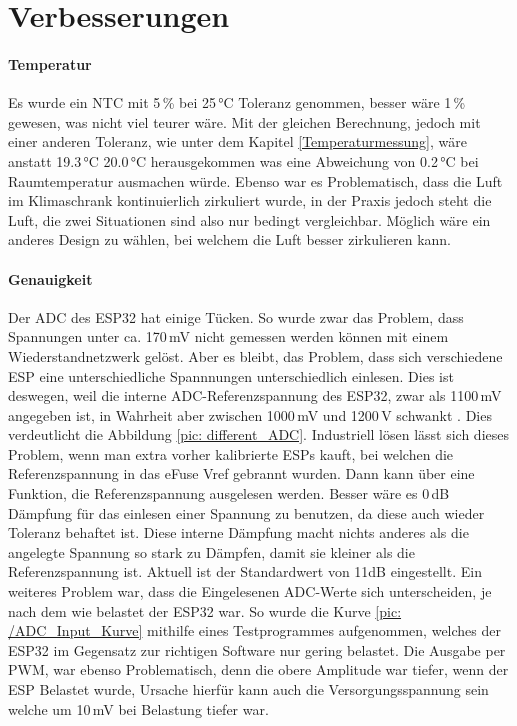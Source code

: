 \section{Verbesserungen} 
\label{Verbesserungen}

\paragraph{Temperatur}
Es wurde ein NTC mit 5\,\% bei 25\,°C Toleranz genommen, besser wäre 1\,\% gewesen, was nicht viel teurer wäre. Mit der gleichen Berechnung, jedoch mit einer anderen Toleranz, wie unter dem Kapitel \ref{Temperaturmessung}, wäre anstatt 19.3\,°C 20.0\,°C herausgekommen was eine Abweichung von 0.2\,°C bei Raumtemperatur ausmachen würde. Ebenso war es Problematisch, dass die Luft im Klimaschrank kontinuierlich zirkuliert wurde, in der Praxis jedoch steht die Luft, die zwei Situationen sind also nur bedingt vergleichbar. Möglich wäre ein anderes Design zu wählen, bei welchem die Luft besser zirkulieren kann.

\paragraph{Genauigkeit}
Der ADC des ESP32 hat einige Tücken. So wurde zwar das Problem, dass Spannungen unter ca. 170\,mV nicht gemessen werden können mit einem Wiederstandnetzwerk gelöst. Aber es bleibt, das Problem, dass sich verschiedene ESP eine unterschiedliche Spannnungen unterschiedlich einlesen. Dies ist deswegen, weil die interne ADC-Referenzspannung des ESP32, zwar als 1100\,mV angegeben ist, in Wahrheit aber zwischen 1000\,mV und 1200\,V schwankt \cite{noauthor_analog_nodate}. Dies verdeutlicht die Abbildung \ref{pic: different_ADC}. Industriell lösen lässt sich dieses Problem, wenn man extra vorher kalibrierte ESPs kauft, bei welchen die Referenzspannung in das eFuse Vref gebrannt wurden. Dann kann über eine Funktion, die Referenzspannung ausgelesen werden. Besser wäre es 0\,dB Dämpfung für das einlesen einer Spannung zu benutzen, da diese auch wieder Toleranz behaftet ist. Diese interne Dämpfung macht nichts anderes als die angelegte  Spannung so stark zu Dämpfen, damit sie kleiner als die Referenzspannung ist. Aktuell ist der Standardwert von 11dB eingestellt. Ein weiteres Problem war, dass die Eingelesenen ADC-Werte sich unterscheiden, je nach dem wie belastet der ESP32 war. So wurde die Kurve \ref{pic: /ADC_Input_Kurve} mithilfe eines Testprogrammes aufgenommen, welches der ESP32 im Gegensatz zur richtigen Software nur gering belastet. Die Ausgabe per PWM, war ebenso Problematisch, denn die obere Amplitude war tiefer, wenn der ESP Belastet wurde, Ursache hierfür kann auch die Versorgungsspannung sein welche um 10\,mV bei Belastung tiefer war.

